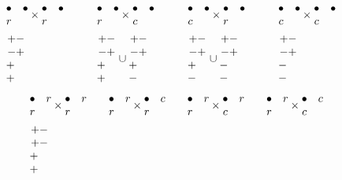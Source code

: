 \documentclass[11pt ,reqno]{amsart}
\begin{document}
\begin{example}
$$\begin{aligned}
\end{aligned}
$$
$$
\begin{aligned}
&\mat\bullet&\bullet\\ r\emat\times\mat\bullet&\bullet\\ r\emat\qquad
&&\mat\bullet&\bullet\\ r\emat\times\mat\bullet&\bullet\\ c\emat\qquad
&&\mat\bullet&\bullet\\ c\emat\times\mat\bullet&\bullet\\ r\emat\qquad
&&\mat\bullet&\bullet\\ c\emat\times\mat\bullet&\bullet \\ c\emat\qquad\\
&\mat +-\\-+\\+\quad\\+\quad\emat
&&\mat +-\\-+\\+\quad\\+\quad\emat\cup\mat +-\\-+\\+\quad\\-\quad\emat
&&\mat +-\\-+\\+\quad\\-\quad\emat\cup\mat +-\\-+\\-\quad\\-\quad\emat
&&\mat +-\\-+\\-\quad\\-\quad\emat
\end{aligned}
$$
$$
\begin{aligned}
&\mat\bullet&r\\ r\emat\times\mat\bullet&r\\ r\emat\quad
&&\mat\bullet&r\\ r\emat\times\mat\bullet&c\\ r\emat\quad
&&\mat\bullet&r\\ r\emat\times\mat\bullet&r\\ c\emat\quad
&&\mat\bullet&r\\ r\emat\times\mat\bullet&c \\ c\emat\quad\\
&\mat +-\\+-\\+\quad\\+\quad\emat

\end{aligned}$$
\end{example}
\end{document}
